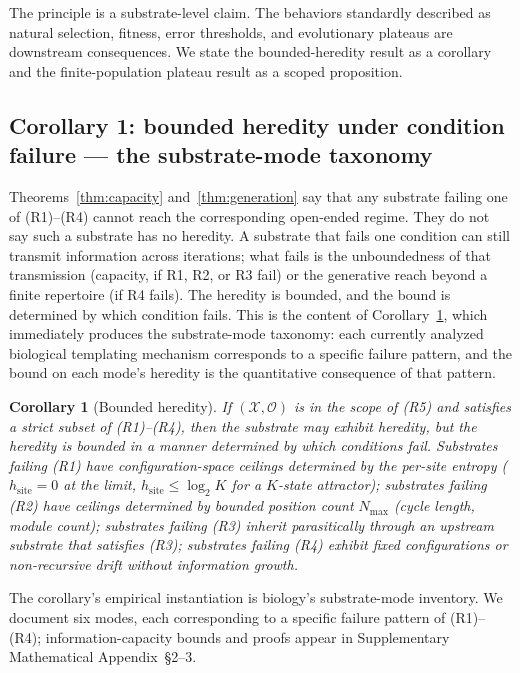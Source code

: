 \documentclass[aps,prx,reprint,amsmath,amssymb,floatfix,superscriptaddress,nofootinbib]{revtex4-2}
\theoremstyle{plain-thm}
\newtheorem{corollary}[theorem]{Corollary}
\theoremstyle{definition-thm}
\newcommand{\Xset}{\mathcal{X}}
\newcommand{\Op}{\mathcal{O}}
\begin{document}
The principle is a substrate-level claim. The behaviors standardly described as natural selection, fitness, error thresholds, and evolutionary plateaus are downstream consequences. We state the bounded-heredity result as a corollary and the finite-population plateau result as a scoped proposition.

\subsection{Corollary 1: bounded heredity under condition failure --- the substrate-mode taxonomy}

Theorems~\ref{thm:capacity} and~\ref{thm:generation} say that any substrate failing one of (R1)--(R4) cannot reach the corresponding open-ended regime. They do not say such a substrate has no heredity. A substrate that fails one condition can still transmit information across iterations; what fails is the unboundedness of that transmission (capacity, if R1, R2, or R3 fail) or the generative reach beyond a finite repertoire (if R4 fails). The heredity is bounded, and the bound is determined by which condition fails. This is the content of Corollary~\ref{cor:bounded}, which immediately produces the substrate-mode taxonomy: each currently analyzed biological templating mechanism corresponds to a specific failure pattern, and the bound on each mode's heredity is the quantitative consequence of that pattern.

\begin{corollary}[Bounded heredity]
\label{cor:bounded}
If $(\Xset, \Op)$ is in the scope of (R5) and satisfies a strict subset of \textnormal{(R1)--(R4)}, then the substrate may exhibit heredity, but the heredity is bounded in a manner determined by which conditions fail. Substrates failing (R1) have configuration-space ceilings determined by the per-site entropy ($h_{\mathrm{site}} = 0$ at the limit, $h_{\mathrm{site}} \le \log_2 K$ for a $K$-state attractor); substrates failing (R2) have ceilings determined by bounded position count $N_{\max}$ (cycle length, module count); substrates failing (R3) inherit parasitically through an upstream substrate that satisfies (R3); substrates failing (R4) exhibit fixed configurations or non-recursive drift without information growth.
\end{corollary}

The corollary's empirical instantiation is biology's substrate-mode inventory. We document six modes, each corresponding to a specific failure pattern of (R1)--(R4); information-capacity bounds and proofs appear in Supplementary Mathematical Appendix~\S2--3.
\end{document}
